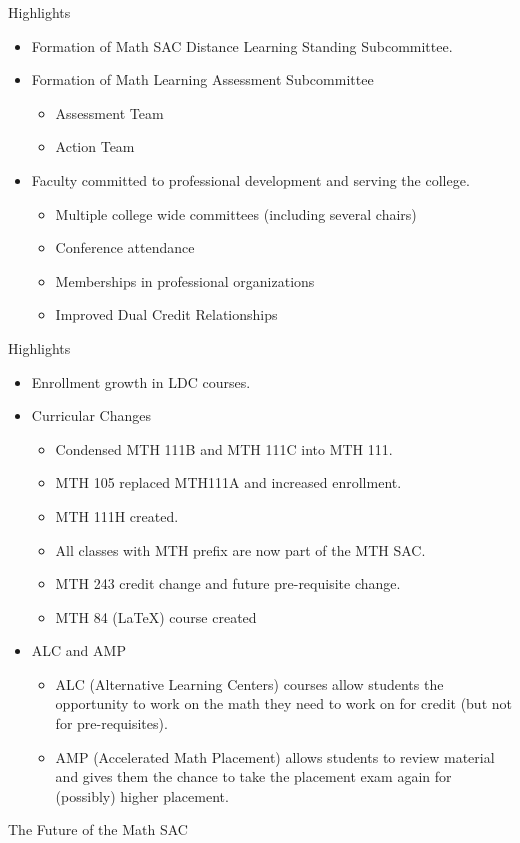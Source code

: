 \documentclass{beamer}
\begin{document}
\begin{frame}{Highlights}
\begin{itemize}
\pause \item Formation of Math SAC Distance Learning Standing Subcommittee.
\pause \item Formation of Math Learning Assessment Subcommittee
	\begin{itemize}
	\pause \item Assessment Team
	\pause \item Action Team
\end{itemize}

\pause \item Faculty committed to professional development and serving the college. 
	\begin{itemize}
	\pause \item Multiple college wide committees (including several chairs)
	\pause \item Conference attendance
	\pause \item Memberships in professional organizations
	\pause \item Improved Dual Credit Relationships
	\end{itemize}

\end{itemize}
\end{frame}

\begin{frame}{Highlights}
\begin{itemize}

\pause \item Enrollment growth in LDC courses. 
\pause \item Curricular Changes
	\begin{itemize}
	\pause \item  Condensed MTH 111B and MTH 111C into MTH 111. 
	\pause \item MTH 105 replaced MTH111A and increased enrollment.  
	\pause \item MTH 111H created. 
	\pause \item All classes with MTH prefix are now part of the MTH SAC. 
	\pause \item MTH 243 credit change and future pre-requisite change. 
	\pause \item MTH 84 (LaTeX) course created
	\end{itemize}
\pause \item ALC and AMP
	\begin{itemize}
	\pause \item ALC (Alternative Learning Centers) courses allow students the opportunity to work on the math they need to work on for credit (but not for pre-requisites). 
	\pause \item AMP (Accelerated Math Placement) allows students to review material and gives them the chance to take the placement exam again for (possibly) higher placement. 
	\end{itemize}

\end{itemize}
\end{frame}
 
\begin{frame}{The Future of the Math SAC}


\end{frame}
\end{document}
